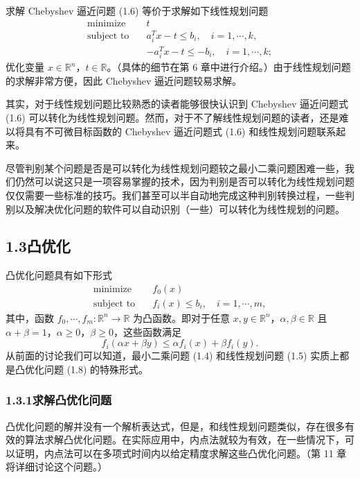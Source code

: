 \documentclass[UTF8,12pt,a4paper,fontset=fandol]{ctexart}
\begin{document}
求解 Chebyshev 逼近问题 (1.6) 等价于求解如下线性规划问题
\begin{equation}
\begin{aligned}
  \text{minimize}\quad & t\\
  \text{subject to}\quad & a_i^Tx-t\le b_i,\quad i=1,\cdots,k,\\
  & -a_i^Tx-t\le -b_i,\quad i=1,\cdots,k;
\end{aligned}
\tag{1.7}
\end{equation}
优化变量 $x\in\mathbb{R}^n$，$t\in\mathbb{R}$。（具体的细节在第 6 章中进行介绍。）由于线性规划问题的求解非常方便，因此 Chebyshev 逼近问题较易求解。

其实，对于线性规划问题比较熟悉的读者能够很快认识到 Chebyshev 逼近问题式 (1.6) 可以转化为线性规划问题。然而，对于不了解线性规划问题的读者，还是难以将具有不可微目标函数的 Chebyshev 逼近问题式 (1.6) 和线性规划问题联系起来。

尽管判别某个问题是否是可以转化为线性规划问题较之最小二乘问题困难一些，我们仍然可以说这只是一项容易掌握的技术，因为判别是否可以转化为线性规划问题仅仅需要一些标准的技巧。我们甚至可以半自动地完成这种判别转换过程，一些判别以及解决优化问题的软件可以自动识别（一些）可以转化为线性规划的问题。

\subsection*{1.3\quad 凸优化}

凸优化问题具有如下形式
\begin{equation}
\begin{aligned}
  \text{minimize}\quad & f_0(x)\\
  \text{subject to}\quad & f_i(x)\le b_i,\quad i=1,\cdots,m,
\end{aligned}
\tag{1.8}
\end{equation}
其中，函数 $f_0,\cdots,f_m:\mathbb{R}^n\to\mathbb{R}$ 为凸函数。即对于任意 $x,y\in\mathbb{R}^n$，$\alpha,\beta\in\mathbb{R}$ 且 $\alpha+\beta=1$，$\alpha\ge0$，$\beta\ge0$，这些函数满足
\[
  f_i(\alpha x+\beta y)\le \alpha f_i(x)+\beta f_i(y).
\]
从前面的讨论我们可以知道，最小二乘问题 (1.4) 和线性规划问题 (1.5) 实质上都是凸优化问题 (1.8) 的特殊形式。

\subsubsection*{1.3.1\quad 求解凸优化问题}

凸优化问题的解并没有一个解析表达式，但是，和线性规划问题类似，存在很多有效的算法求解凸优化问题。在实际应用中，内点法就较为有效，在一些情况下，可以证明，内点法可以在多项式时间内以给定精度求解这些凸优化问题。（第 11 章将详细讨论这个问题。）
\end{document}
